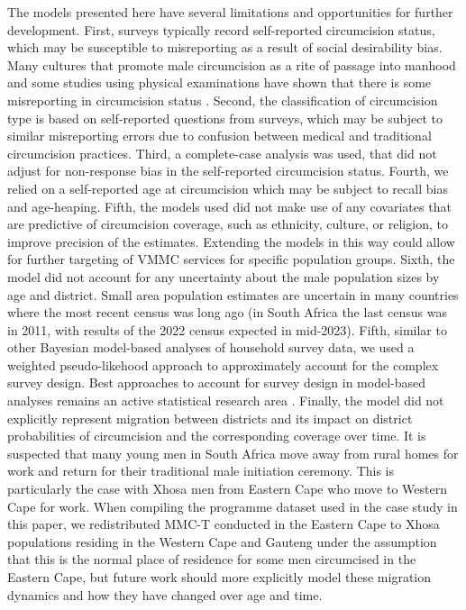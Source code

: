 \documentclass{article}
\begin{document}
The models presented here have several limitations and opportunities for further development. First, surveys typically record self-reported circumcision status, which may be susceptible to misreporting as a result of social desirability bias. Many cultures that promote male circumcision as a rite of passage into manhood and some studies using physical examinations have shown that there is some misreporting in circumcision status \cite{lagarde2003acceptability, lissouba2011adult}. Second, the classification of circumcision type is based on self-reported questions from surveys, which may be subject to similar misreporting errors due to confusion between medical and traditional circumcision practices. Third, a complete-case analysis was used, that did not adjust for non-response bias in the self-reported circumcision status. Fourth, we relied on a self-reported age at circumcision which may be subject to recall bias and age-heaping. Fifth, the models used did not make use of any covariates that are predictive of circumcision coverage, such as ethnicity, culture, or religion, to improve precision of the estimates. Extending the models in this way could allow for further targeting of VMMC services for specific population groups. Sixth, the model did not account for any uncertainty about the male population sizes by age and district. Small area population estimates are uncertain in many countries where the most recent census was long ago (in South Africa the last census was in 2011, with results of the 2022 census expected in mid-2023). Fifth, similar to other Bayesian model-based analyses of household survey data, we used a weighted pseudo-likehood approach to approximately account for the complex survey design. Best approaches to account for survey design in model-based analyses remains an active statistical research area \cite{gelman2007struggles, chen2014use}. Finally, the model did not explicitly represent migration between districts and its impact on district probabilities of circumcision and the corresponding coverage over time. It is suspected that many young men in South Africa move away from rural homes for work and return for their traditional male initiation ceremony. This is particularly the case with Xhosa men from Eastern Cape who move to Western Cape for work. When compiling the programme dataset used in the case study in this paper, we redistributed MMC-T conducted in the Eastern Cape to Xhosa populations residing in the Western Cape and Gauteng under the assumption that this is the normal place of residence for some men circumcised in the Eastern Cape, but future work should more explicitly model these migration dynamics and how they have changed over age and time.
\end{document}
